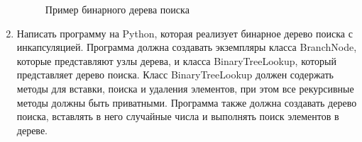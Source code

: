 \begin{enumerate}
\begin{figure}[h]
\centering
{}
\caption{Пример бинарного дерева поиска}
\end{figure}

\item Написать программу на Python, которая реализует бинарное дерево поиска с инкапсуляцией. Программа должна создавать экземпляры класса BranchNode, которые представляют узлы дерева, и класса BinaryTreeLookup, который представляет дерево поиска. Класс BinaryTreeLookup должен содержать методы для вставки, поиска и удаления элементов, при этом все рекурсивные методы должны быть приватными. Программа также должна создавать дерево поиска, вставлять в него случайные числа и выполнять поиск элементов в дереве.


\end{enumerate}
